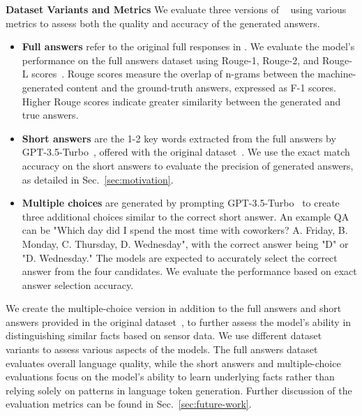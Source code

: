 \textbf{Dataset Variants and Metrics}
We evaluate three versions of \Dataset~\cite{sensorqa} using various metrics to assess both the quality and accuracy of the generated answers.
\begin{itemize}[topsep=0pt, itemsep=0pt]
    \item \textbf{Full answers} refer to the original full responses  in \Dataset. We evaluate the model's performance on the full answers dataset using Rouge-1, Rouge-2, and Rouge-L scores~\cite{eyal-etal-2019-question}. Rouge scores measure the overlap of n-grams between the machine-generated content and the ground-truth answers, expressed as F-1 scores. Higher Rouge scores indicate greater similarity between the generated and true answers.
    \item \textbf{Short answers} are the 1-2 key words extracted from the full answers by GPT-3.5-Turbo~\cite{gpt-3.5}, offered with the original \Dataset dataset~\citesensorqa. We use the exact match accuracy on the short answers to evaluate the precision of generated answers, as detailed in Sec.~\ref{sec:motivation}.
    \item \textbf{Multiple choices} are generated by prompting GPT-3.5-Turbo~\cite{gpt-3.5} to create three additional choices similar to the correct short answer. An example QA can be "Which day did I spend the most time with coworkers? A. Friday, B. Monday, C. Thursday, D. Wednesday", with the correct answer being "D" or "D. Wednesday." The models are expected to accurately select the correct answer from the four candidates. We evaluate the performance based on exact answer selection accuracy.
\end{itemize}
We create the multiple-choice version in addition to the full answers and short answers provided in the original \Dataset dataset~\citesensorqa, to further assess the model's ability in distinguishing similar facts based on sensor data. 
We use different dataset variants to assess various aspects of the models. The full answers dataset evaluates overall language quality, while the short answers and multiple-choice evaluations focus on the model's ability to learn underlying facts rather than relying solely on patterns in language token generation. Further discussion of the evaluation metrics can be found in Sec.~\ref{sec:future-work}.


